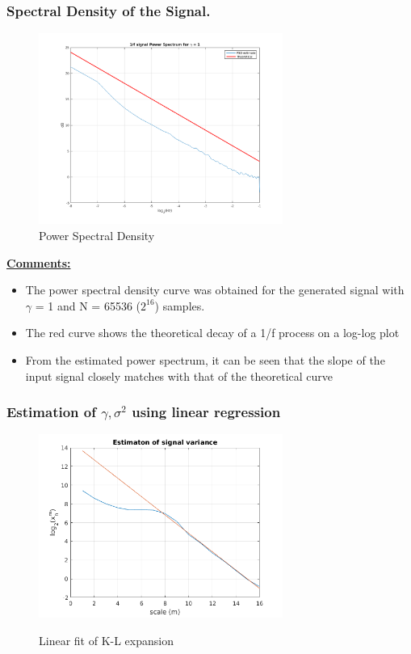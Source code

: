 \documentclass[a4paper]{article}
\begin{document}
\subsubsection{Spectral Density of the Signal.}

\begin{figure}
\vspace{-15pt}
\includegraphics[width=8cm]{spectrum.png}
\caption{Power Spectral Density}
\vspace{-100pt}
\end{figure} 

\underline{\textbf{Comments:}}
\begin{itemize}
\item The power spectral density curve was obtained for the generated signal with $\gamma$ = 1 and N = 65536 ($2^{16}$) samples. 
\item The red curve shows the theoretical decay of a 1/f process on a log-log plot
\item From the estimated power spectrum, it can be seen that the slope of the input signal closely matches with that of the theoretical curve

\end{itemize}
\vspace{2 cm}

\subsubsection{Estimation of $\gamma , \sigma^2 $ using linear regression}

\begin{figure}
\vspace{-15pt}
\includegraphics[width=8cm]{regression.png}
\label{fig:regr}
\caption{Linear fit of K-L expansion}
\vspace{-70pt}
\end{figure} 
\end{document}
